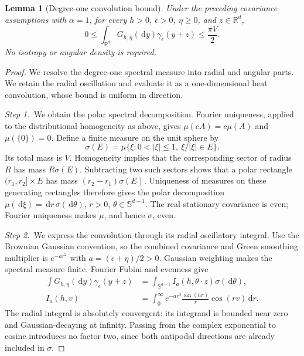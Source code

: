 \documentclass[12pt,oneside,openany]{book}
\makeatletter
\let\lean@pending\@empty
\newcommand{\LeanMarker}[1]{\gdef\lean@pending{#1}}
\numberwithin{equation}{section}
\newtheorem{lemma}[theorem]{Lemma}
\theoremstyle{nogostyle}
\theoremstyle{definition}
\newcommand{\R}{\mathbb{R}}
\newcommand{\ud}{\,\mathrm{d}}
\makeatother
\begin{document}
\LeanMarker{L:alpha-one-convolution}
\begin{lemma}[Degree-one convolution bound]\label{L:alpha-one-convolution}
  Under the preceding covariance assumptions with $\alpha = 1$, for every $h >
  0$, $\epsilon > 0$, $\eta \ge 0$, and $z \in \R^d$,
  \begin{equation}\label{E:alpha-one-convolution}
    0\le\int_{\R^d}G_{h,\eta}(\ud y)\gamma_\epsilon(y+z)
    \le\frac{\pi V}{2}.
  \end{equation}
  No isotropy or angular density is required.
\end{lemma}

\begin{proof}
  We resolve the degree-one spectral measure into radial and angular parts. We
  retain the radial oscillation and evaluate it as a one-dimensional heat
  convolution, whose bound is uniform in direction.


  \medskip
  \noindent\textit{Step 1.~}We obtain the polar spectral decomposition.
  Fourier uniqueness, applied to the distributional homogeneity as above, gives
  $\mu(cA) = c\mu(A)$ and $\mu(\{0\}) = 0$. Define a finite measure on the unit
  sphere by
  \[
    \sigma(E)=\mu\{\xi:0<|\xi|\le1,\ \xi/|\xi|\in E\}.
  \]
  Its total mass is $V$. Homogeneity implies that the corresponding sector of
  radius $R$ has mass $R\sigma(E)$. Subtracting two such sectors shows that a
  polar rectangle $(r_1,r_2]\times E$ has mass $(r_2-r_1)\sigma(E)$. Uniqueness
  of measures on these generating rectangles therefore gives the polar
  decomposition $\mu(\ud\xi) = \ud r\,\sigma(\ud\theta)$, $r > 0$, $\theta \in
  \mathbb{S}^{d-1}$. The real stationary covariance is even; Fourier uniqueness
  makes $\mu$, and hence $\sigma$, even.


  \medskip
  \noindent\textit{Step 2.~}We express the convolution through its radial
  oscillatory integral.
  Use the Brownian Gaussian convention, so the combined covariance and Green
  smoothing multiplier is $e^{-ar^2}$ with $a = (\epsilon+\eta)/2 > 0$. Gaussian
  weighting makes the spectral measure finite. Fourier Fubini and evenness give
  \begin{equation}\label{E:alpha-one-polar}
    \begin{split}
      \int G_{h,\eta}(\ud y)\gamma_\epsilon(y+z)
      &=\int_{\mathbb{S}^{d-1}} I_a(h,\theta\cdot z)\sigma(\ud\theta),\\
      I_a(h,v)&=\int_0^\infty e^{-ar^2}
      \frac{\sin(hr)}r\cos(rv)\ud r.
    \end{split}
  \end{equation}
  The radial integral is absolutely convergent: its integrand is bounded near
  zero and Gaussian-decaying at infinity. Passing from the complex exponential
  to cosine introduces no factor two, since both antipodal directions are
  already included in $\sigma$.



\end{proof}
\end{document}
